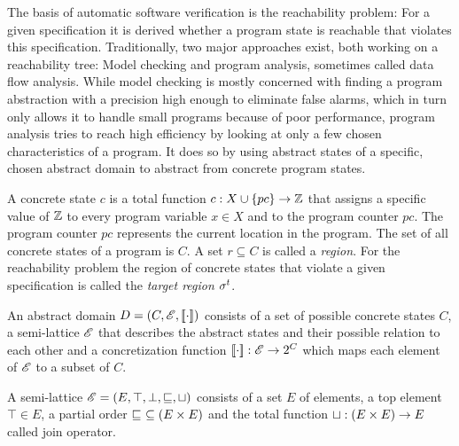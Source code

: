 The basis of automatic software verification is the reachability problem: For a given specification it is derived whether a program state is reachable that violates this specification.
Traditionally, two major approaches exist, both working on a reachability tree: Model checking and program analysis, sometimes called data flow analysis.
While model checking is mostly concerned with finding a program abstraction with a precision high enough to eliminate false alarms,
which in turn only allows it to handle small programs because of poor performance,
program analysis tries to reach high efficiency by looking at only a few chosen characteristics of a program. %
It does so by using abstract states of a specific, chosen abstract domain to abstract from concrete program states.

A concrete state $c$ is a total function $c: X \cup \{pc\} \rightarrow \mathbb{Z}$ that assigns a specific value of $\mathbb{Z}$ to every program variable $x \in X$ and to the program counter $pc$. The program counter $pc$ represents the current location in the program.
The set of all concrete states of a program is $C$. A set $r \subseteq C$ is called a \emph{region}.
For the reachability problem the region of concrete states that violate a given specification is called the \emph{target region} $\sigma^{t}$.

An abstract domain \cite{Beyer2007} $D = (C, \mathscr{E}, [\![ \cdot ]\!])$ consists of a set of possible concrete states $C$, a semi-lattice $\mathscr{E}$ that describes the abstract states and their possible relation to each other and a concretization function $[\![ \cdot ]\!] : \mathscr{E} \rightarrow 2^C$ which maps each element of $\mathscr{E}$ to a subset of $C$.

A semi-lattice $\mathscr{E} = (E, \top, \bot, \sqsubseteq, \sqcup)$ consists of a set $E$ of elements, a top element $\top \in E$, a partial order $\sqsubseteq\ \subseteq (E \times E)$
and the total function $\sqcup : (E \times E) \rightarrow E$ called join operator.

